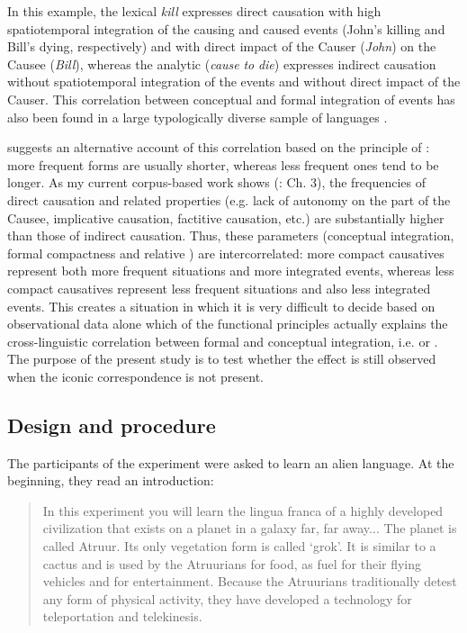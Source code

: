 \documentclass[output=paper]{langsci/langscibook}
\begin{document}
In this example, the lexical  \textit{kill} expresses direct causation with high spatiotemporal integration of the causing and caused events (John’s killing and Bill’s dying, respectively) and with direct impact of the Causer (\textit{John}) on the Causee (\textit{Bill}), whereas the analytic  (\textit{cause} \textit{to} \textit{die}) expresses indirect causation without spatiotemporal integration of the events and without direct impact of the Causer. This correlation between conceptual and formal integration of events has also been found in a large typologically diverse sample of languages \citep{Levshina2018_CausTyp}.

\citet{Haspelmath2008_FreqIcon} suggests an alternative account of this correlation based on the principle of : more frequent forms are usually shorter, whereas less frequent ones tend to be longer. As my current corpus-based work shows (\citealt{Levshina2018_Effic}: Ch. 3), the frequencies of direct causation and related properties (e.g. lack of autonomy on the part of the Causee, implicative causation, factitive causation, etc.) are substantially higher than those of indirect causation. Thus, these parameters (conceptual integration, formal compactness and relative ) are intercorrelated: more compact causatives represent both more frequent situations and more integrated events, whereas less compact causatives represent less frequent situations and also less integrated events. This creates a situation in which it is very difficult to decide based on observational data alone which of the functional principles actually explains the cross-linguistic correlation between formal and conceptual integration, i.e.  or . The purpose of the present study is to test whether the  effect is still observed when the iconic correspondence is not present. 

\subsection{Design and procedure}

The participants of the experiment were asked to learn an alien language. At the beginning, they read an introduction:

\begin{quote}
In this experiment you will learn the lingua franca of a highly developed civilization that exists on a planet in a galaxy far, far away...  The planet is called Atruur. Its only vegetation form is called ‘grok’. It is similar to a cactus and is used by the Atruurians for food, as fuel for their flying vehicles and for entertainment. Because the Atruurians traditionally detest any form of physical activity, they have developed a technology for teleportation and telekinesis.
\end{quote}
\end{document}
